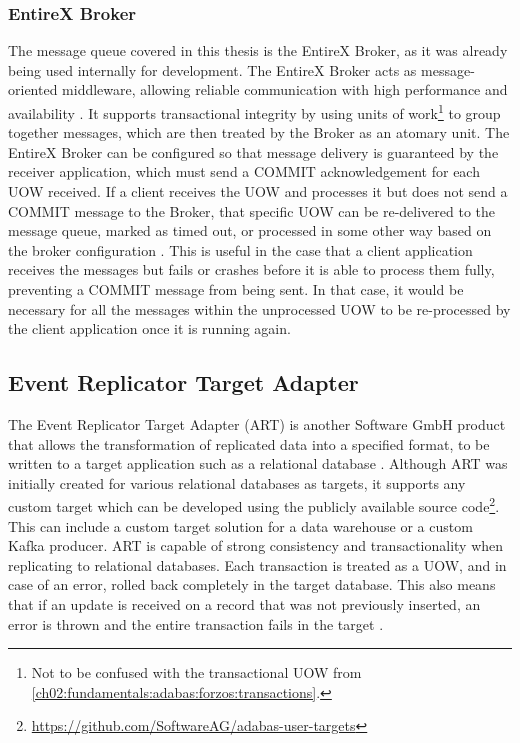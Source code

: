 \subsubsection{EntireX Broker}
\label{ch02:fundamentals:adabas:entirex}
The message queue covered in this thesis is the EntireX Broker, as it was already being used internally for development. The EntireX Broker acts as message-oriented middleware, allowing reliable communication with high performance and availability \cite{entirexbrokerintro}. It supports transactional integrity by using units of work\footnote{Not to be confused with the transactional \ac{UOW} from \ref{ch02:fundamentals:adabas:forzos:transactions}.} to group together messages, which are then treated by the Broker as an atomary unit. The EntireX Broker can be configured so that message delivery is guaranteed by the receiver application, which must send a COMMIT acknowledgement for each \ac{UOW} received. If a client receives the \ac{UOW} and processes it but does not send a COMMIT message to the Broker, that specific \ac{UOW} can be re-delivered to the message queue, marked as timed out, or processed in some other way based on the broker configuration \cite{entirexbrokeradmin}. This is useful in the case that a client application receives the messages but fails or crashes before it is able to process them fully, preventing a COMMIT message from being sent. In that case, it would be necessary for all the messages within the unprocessed \ac{UOW} to be re-processed by the client application once it is running again.

\subsection{Event Replicator Target Adapter}
\label{ch02:fundamentals:adabas:art}
The Event Replicator Target Adapter (\ac{ART}) is another Software GmbH product that allows the transformation of replicated data into a specified format, to be written to a target application such as a relational database \cite{artconcepts}. Although \ac{ART} was initially created for various relational databases as targets, it supports any custom target which can be developed using the publicly available source code\footnote{\url{https://github.com/SoftwareAG/adabas-user-targets}}. This can include a custom target solution for a data warehouse or a custom Kafka producer. \ac{ART} is capable of strong consistency and transactionality when replicating to relational databases. Each transaction is treated as a \ac{UOW}, and in case of an error, rolled back completely in the target database. This also means that if an update is received on a record that was not previously inserted, an error is thrown and the entire transaction fails in the target \cite{artconcepts}.

